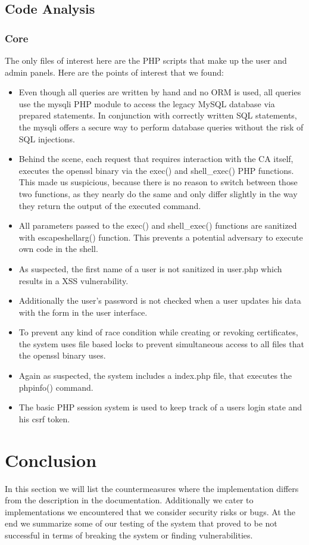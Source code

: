 \documentclass{article}
\begin{document}
\subsection{Code Analysis}
\subsubsection*{Core}
The only files of interest here are the PHP scripts that make up the user and admin panels. Here are the points of interest that we found:
\begin{itemize}
\item Even though all queries are written by hand and no ORM is used, all queries use the mysqli PHP module to access the legacy MySQL database via prepared statements. In conjunction with correctly written SQL statements, the mysqli offers a secure way to perform database queries without the risk of SQL injections.
\item Behind the scene, each request that requires interaction with the CA itself, executes the openssl binary via the exec() and shell\_exec() PHP functions. This made us suspicious, because there is no reason to switch between those two functions, as they nearly do the same and only differ slightly in the way they return the output of the executed command.
\item All parameters passed to the exec() and shell\_exec() functions are sanitized with escapeshellarg() function. This prevents a potential adversary to execute own code in the shell.
\item As suspected, the first name of a user is not sanitized in user.php which results in a XSS vulnerability.
\item Additionally the user's password is not checked when a user updates his data with the form in the user interface.
\item To prevent any kind of race condition while creating or revoking certificates, the system uses file based locks to prevent simultaneous access to all files that the openssl binary uses.
\item Again as suspected, the system includes a index.php file, that executes the phpinfo() command.
\item The basic PHP session system is used to keep track of a users login state and his csrf token.
\end{itemize}

\section{Conclusion}
In this section we will list the countermeasures where the implementation differs from the description in the documentation. Additionally we cater to implementations we encountered that we consider security risks or bugs. At the end we summarize some of our testing of the system that proved to be not successful in terms of breaking the system or finding vulnerabilities.
\end{document}
